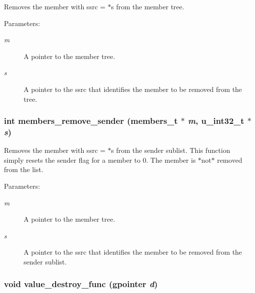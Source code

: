 Removes the member with ssrc = $\ast$s from the member tree. \begin{Desc}
\item[Parameters:]
\begin{description}
\item[{\em m}]A pointer to the member tree. \item[{\em s}]A pointer to the ssrc that identifies the member to be removed from the tree. \end{description}
\end{Desc}
\subsubsection{\setlength{\rightskip}{0pt plus 5cm}int members\_\-remove\_\-sender ({\bf members\_\-t} $\ast$ {\em m}, u\_\-int32\_\-t $\ast$ {\em s})}\label{members_8c_a8}


Removes the member with ssrc = $\ast$s from the sender sublist. This function simply resets the sender flag for a member to 0. The member is $\ast$not$\ast$ removed from the list. \begin{Desc}
\item[Parameters:]
\begin{description}
\item[{\em m}]A pointer to the member tree. \item[{\em s}]A pointer to the ssrc that identifies the member to be removed from the sender sublist. \end{description}
\end{Desc}
\subsubsection{\setlength{\rightskip}{0pt plus 5cm}void value\_\-destroy\_\-func (gpointer {\em d})\hspace{0.3cm}{\tt  [static]}}\label{members_8c_a2}


